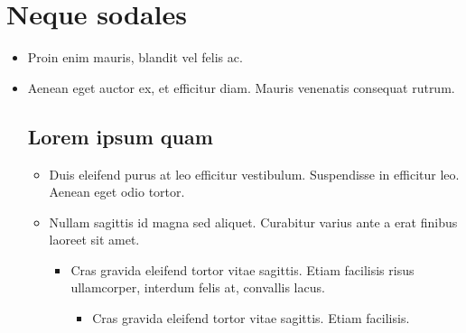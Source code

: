\documentclass[header]{nosvagor-notes}
\begin{document}
\section{Neque sodales}
\begin{itemize}
  \item Proin enim mauris, blandit vel felis ac.

  \item Aenean eget auctor ex, et efficitur diam. Mauris venenatis consequat rutrum.

  \subsection{Lorem ipsum quam}
  \begin{itemize}
    \item Duis eleifend purus at leo efficitur vestibulum. Suspendisse in
      efficitur leo. Aenean eget odio tortor.

    \item Nullam sagittis id magna sed aliquet. Curabitur varius ante a erat
      finibus laoreet sit amet.
      \begin{itemize}
        \item Cras gravida eleifend tortor vitae sagittis. Etiam facilisis
          risus ullamcorper, interdum felis at, convallis lacus.
          \begin{itemize}
            \item Cras gravida eleifend tortor vitae sagittis. Etiam facilisis.

          \end{itemize}
      \end{itemize}
  \end{itemize}

\end{itemize}
\end{document}
